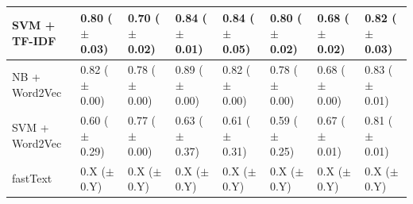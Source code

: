 \documentclass[a4paper,twoside,phd]{BYUPhys}
\begin{document}
\begin{table}[H]
\begin{tabular}{|p{1.7cm}|p{1.6cm}|p{1.6cm}|p{1.6cm}|p{1.6cm}|p{1.6cm}|p{1.6cm}|p{1.6cm}|}
		SVM + TF-IDF  & 0.80 \newline ($\pm$ 0.03) & 0.70 \newline ($\pm$ 0.02) & 0.84 \newline ($\pm$ 0.01) & 0.84 \newline ($\pm$ 0.05) & 0.80 \newline ($\pm$ 0.02)  & 0.68 \newline ($\pm$ 0.02)  & 0.82 \newline ($\pm$ 0.03)                                                                                                                                             \\
		\hline                                                                                                                                              
		
		NB + Word2Vec  & 0.82 \newline ($\pm$ 0.00) & 0.78 \newline ($\pm$ 0.00) & 0.89 \newline ($\pm$ 0.00) & 0.82 \newline ($\pm$ 0.00) & 0.78 \newline ($\pm$ 0.00)  & 0.68 \newline ($\pm$ 0.00)   & 0.83 \newline ($\pm$ 0.01)  \\
		\hline
		
		SVM + Word2Vec  & 0.60 \newline ($\pm$ 0.29) & 0.77 \newline ($\pm$ 0.00) & 0.63 \newline ($\pm$ 0.37) & 0.61 \newline ($\pm$ 0.31) & 0.59 \newline ($\pm$ 0.25)  & 0.67 \newline ($\pm$ 0.01) & 0.81 \newline ($\pm$ 0.01)                                                                                                                                              \\
		\hline
		
		fastText  & 0.X \newline ($\pm$ 0.Y) & 0.X \newline ($\pm$ 0.Y) & 0.X \newline ($\pm$ 0.Y) & 0.X \newline ($\pm$ 0.Y) & 0.X \newline ($\pm$ 0.Y)  & 0.X \newline ($\pm$ 0.Y) & 0.X \newline ($\pm$ 0.Y)                                                                                                                                              \\
		\hline
		                                                                                                                                                                                         

\end{tabular}
\end{table}
\end{document}
